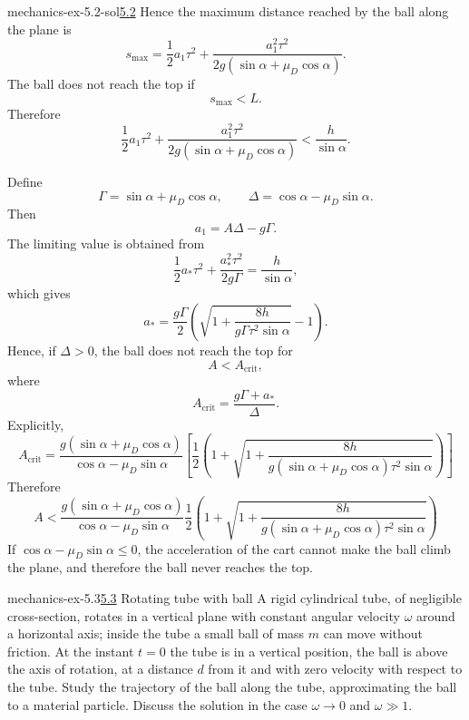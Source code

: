 \documentclass[preview]{standalone}
\begin{document}
\begin{snippetsolution}{mechanics-ex-5.2-sol}{\underline{5.2}}
    Hence the maximum distance reached by the ball along the plane is
    \[
        s_{\max}
        =
        \frac{1}{2}a_1\tau^2
        +
        \frac{a_1^2\tau^2}
        {2g(\sin\alpha+\mu_D\cos\alpha)}.
    \]
    The ball does not reach the top if
    \[
        s_{\max} < L.
    \]
    Therefore
    \[
        \frac{1}{2}a_1\tau^2
        +
        \frac{a_1^2\tau^2}
        {2g(\sin\alpha+\mu_D\cos\alpha)}
        <
        \frac{h}{\sin\alpha}.
    \]

    Define
    \[
        \Gamma = \sin\alpha+\mu_D\cos\alpha,
        \qquad
        \Delta = \cos\alpha-\mu_D\sin\alpha.
    \]
    Then
    \[
        a_1 = A\Delta - g\Gamma.
    \]
    The limiting value is obtained from
    \[
        \frac{1}{2}a_*\tau^2
        +
        \frac{a_*^2\tau^2}{2g\Gamma}
        =
        \frac{h}{\sin\alpha},
    \]
    which gives
    \[
        a_*
        =
        \frac{g\Gamma}{2}
        \left(
            \sqrt{
                1+
                \frac{8h}{g\Gamma\tau^2\sin\alpha}
            }
            -1
        \right).
    \]
    Hence, if \(\Delta>0\), the ball does not reach the top for
    \[
        A
        <
        A_{\mathrm{crit}},
    \]
    where
    \[
        A_{\mathrm{crit}}
        =
        \frac{g\Gamma+a_*}{\Delta}.
    \]
    Explicitly,
    \[
        A_{\mathrm{crit}}
        =
        \frac{g(\sin\alpha+\mu_D\cos\alpha)}{\cos\alpha-\mu_D\sin\alpha}
        \left[
            \frac{1}{2}
            \left(
                1+
                \sqrt{
                    1+
                    \frac{8h}
                    {g(\sin\alpha+\mu_D\cos\alpha)\tau^2\sin\alpha}
                }
            \right)
        \right]
    \]
    Therefore
    \[
        A
        <
        \frac{g(\sin\alpha+\mu_D\cos\alpha)}
        {\cos\alpha-\mu_D\sin\alpha}
        \frac{1}{2}
        \left(
            1+
            \sqrt{
                1+
                \frac{8h}
                {g(\sin\alpha+\mu_D\cos\alpha)\tau^2\sin\alpha}
            }
        \right)
    \]
    If \(\cos\alpha-\mu_D\sin\alpha\leq 0\), the acceleration of the cart cannot
    make the ball climb the plane, and therefore the ball never reaches the top.
\end{snippetsolution}

\begin{snippetexercise}{mechanics-ex-5.3}{\underline{5.3} Rotating tube with ball}
    A rigid cylindrical tube, of negligible cross-section, rotates in a vertical plane with constant angular velocity
    \(\omega\) around a horizontal axis; inside the tube a small ball of mass \(m\) can move without friction.
    At the instant \(t=0\) the tube is in a vertical position, the ball is above the axis of rotation,
    at a distance \(d\) from it and with zero velocity with respect to the tube.
    Study the trajectory of the ball along the tube, approximating the ball to a material particle.
    Discuss the solution in the case
    \(\omega \to 0\) and \(\omega \gg 1\).
\end{snippetexercise}
\end{document}
